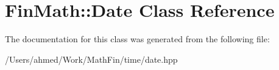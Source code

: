 \hypertarget{class_fin_math_1_1_date}{}\section{Fin\+Math\+:\+:Date Class Reference}
\label{class_fin_math_1_1_date}


The documentation for this class was generated from the following file\+:\begin{DoxyCompactItemize}
\item 
/\+Users/ahmed/\+Work/\+Math\+Fin/time/date.\+hpp\end{DoxyCompactItemize}
